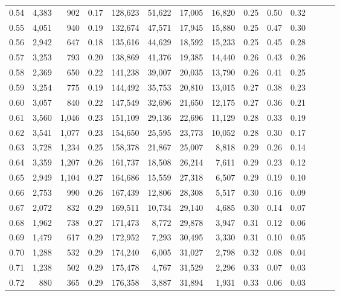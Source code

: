 \begin{tabular}{rrrrrrrrrrrrrr}
0.54 &  4,383 &    902 &  0.17 &  128,623 &   51,622 &  17,005 &  16,820 &  0.25 &  0.50 &      0.32 \\
0.55 &  4,051 &    940 &  0.19 &  132,674 &   47,571 &  17,945 &  15,880 &  0.25 &  0.47 &      0.30 \\
0.56 &  2,942 &    647 &  0.18 &  135,616 &   44,629 &  18,592 &  15,233 &  0.25 &  0.45 &      0.28 \\
0.57 &  3,253 &    793 &  0.20 &  138,869 &   41,376 &  19,385 &  14,440 &  0.26 &  0.43 &      0.26 \\
0.58 &  2,369 &    650 &  0.22 &  141,238 &   39,007 &  20,035 &  13,790 &  0.26 &  0.41 &      0.25 \\
0.59 &  3,254 &    775 &  0.19 &  144,492 &   35,753 &  20,810 &  13,015 &  0.27 &  0.38 &      0.23 \\
0.60 &  3,057 &    840 &  0.22 &  147,549 &   32,696 &  21,650 &  12,175 &  0.27 &  0.36 &      0.21 \\
0.61 &  3,560 &  1,046 &  0.23 &  151,109 &   29,136 &  22,696 &  11,129 &  0.28 &  0.33 &      0.19 \\
0.62 &  3,541 &  1,077 &  0.23 &  154,650 &   25,595 &  23,773 &  10,052 &  0.28 &  0.30 &      0.17 \\
0.63 &  3,728 &  1,234 &  0.25 &  158,378 &   21,867 &  25,007 &   8,818 &  0.29 &  0.26 &      0.14 \\
0.64 &  3,359 &  1,207 &  0.26 &  161,737 &   18,508 &  26,214 &   7,611 &  0.29 &  0.23 &      0.12 \\
0.65 &  2,949 &  1,104 &  0.27 &  164,686 &   15,559 &  27,318 &   6,507 &  0.29 &  0.19 &      0.10 \\
0.66 &  2,753 &    990 &  0.26 &  167,439 &   12,806 &  28,308 &   5,517 &  0.30 &  0.16 &      0.09 \\
0.67 &  2,072 &    832 &  0.29 &  169,511 &   10,734 &  29,140 &   4,685 &  0.30 &  0.14 &      0.07 \\
0.68 &  1,962 &    738 &  0.27 &  171,473 &    8,772 &  29,878 &   3,947 &  0.31 &  0.12 &      0.06 \\
0.69 &  1,479 &    617 &  0.29 &  172,952 &    7,293 &  30,495 &   3,330 &  0.31 &  0.10 &      0.05 \\
0.70 &  1,288 &    532 &  0.29 &  174,240 &    6,005 &  31,027 &   2,798 &  0.32 &  0.08 &      0.04 \\
0.71 &  1,238 &    502 &  0.29 &  175,478 &    4,767 &  31,529 &   2,296 &  0.33 &  0.07 &      0.03 \\
0.72 &    880 &    365 &  0.29 &  176,358 &    3,887 &  31,894 &   1,931 &  0.33 &  0.06 &      0.03 \\

\end{tabular}
